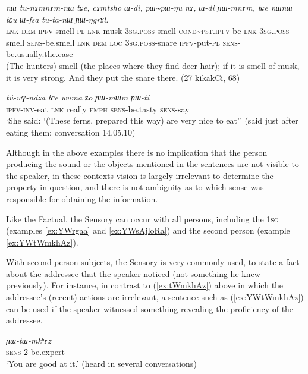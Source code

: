 \documentclass[oldfontcommands,oneside,a4paper,11pt]{article}
\newcommand{\ipa}[1]{{\phon\textit{#1}}} %
\newcommand{\refb}[1]{(\ref{#1})}
\newcommand{\rdp}{\textasciitilde{}}
\begin{document}
\begin{exe}
\ex \label{ex:tunAmnAmnW}
\gll \ipa{tɕe} 	\ipa{nɯ} 	\ipa{tu-nɤmnɤm-nɯ} 	\ipa{tɕe,} 	\ipa{cɤmtsho} 	\ipa{ɯ-di,} 	\ipa{pɯ\rdp{}pɯ-ŋu} 	\ipa{nɤ,} 	\ipa{ɯ-di} 	\ipa{ɲɯ-mnɤm,} \ipa{tɕe} 	\ipa{nɯnɯ} 	\ipa{tɕu} 	\ipa{ɯ-fsa} 	\ipa{tu-ta-nɯ} 	\ipa{ɲɯ-ŋgrɤl.} \\
\textsc{lnk} \textsc{dem} \textsc{ipfv}-smell-\textsc{pl} \textsc{lnk} musk \textsc{3sg.poss}-smell \textsc{cond\rdp{}pst.ipfv}-be \textsc{lnk} \textsc{3sg.poss}-smell \textsc{sens}-be.smell \textsc{lnk} \textsc{dem} \textsc{loc} \textsc{3sg.poss}-snare \textsc{ipfv}-put-\textsc{pl} \textsc{sens}-be.usually.the.case \\
\glt (The hunters) smell (the places where they find deer hair); if it is smell of musk, it is very strong. And they put the snare there. (27 kikakCi, 68)
\end{exe}

\begin{exe}
\ex \label{ex:YWmWm}
\gll
\ipa{tú-wɣ-ndza} 	\ipa{tɕe} 	\ipa{wuma} 	\ipa{ʑo} 	\ipa{ɲɯ-mɯm} 	\ipa{ɲɯ-ti} \\
\textsc{ipfv-inv}-eat \textsc{lnk} really \textsc{emph} \textsc{sens}-be.tasty \textsc{sens}-say \\
\glt `She said: `(These ferns, prepared this way) are very nice to eat'' (said just after eating them; conversation 14.05.10)
\end{exe}

Although in the above examples there is no implication that the person producing the sound or the objects mentioned in the sentences are not visible to the speaker, in these contexts vision is largely irrelevant to determine the property in question, and there is not ambiguity as to which sense was responsible for obtaining the information.  

Like the Factual, the Sensory can occur with all persons, including the \textsc{1sg} (examples \ref{ex:YWrgaa} and \ref{ex:YWsAjloRa}) and the second person (example \ref{ex:YWtWmkhAz}).

With second person subjects, the Sensory is very commonly used, to state a fact about the addressee that the speaker noticed (not something he knew previously). For instance, in contrast to \refb{ex:tWmkhAz} above in which the addressee's (recent) actions are irrelevant, a sentence such as \refb{ex:YWtWmkhAz} can be used if the speaker witnessed something revealing the proficiency of the addressee.

\begin{exe}
\ex \label{ex:YWtWmkhAz}
\gll 
 \ipa{ɲɯ-tɯ-mkʰɤz} \\
\textsc{sens}-2-be.expert \\
\glt `You are good at it.' (heard in several conversations)
\end{exe}
\end{document}
